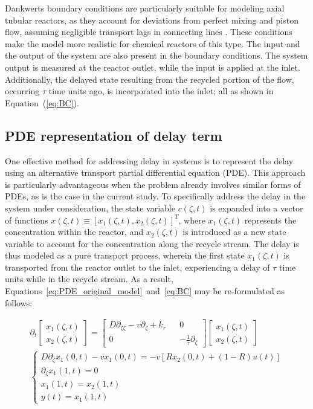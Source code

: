 Dankwerts boundary conditions are particularly suitable for modeling axial tubular reactors, as they account for deviations from perfect mixing and piston flow, assuming negligible transport lags in connecting lines \autocite{danckwerts1993continuous}. These conditions make the model more realistic for chemical reactors of this type. The input and the output of the system are also present in the boundary conditions. The system output is measured at the reactor outlet, while the input is applied at the inlet. Additionally, the delayed state resulting from the recycled portion of the flow, occurring $\tau$ time units ago, is incorporated into the inlet; all as shown in Equation~(\ref{eq:BC}).


\subsection{PDE representation of delay term}

One effective method for addressing delay in systems is to represent the delay using an alternative transport partial differential equation (PDE). This approach is particularly advantageous when the problem already involves similar forms of PDEs, as is the case in the current study. To specifically address the delay in the system under consideration, the state variable $c(\zeta, t)$ is expanded into a vector of functions $x(\zeta, t) \equiv [x_1(\zeta, t), x_2(\zeta, t)]^T$, where $x_1(\zeta, t)$ represents the concentration within the reactor, and $x_2(\zeta, t)$ is introduced as a new state variable to account for the concentration along the recycle stream. The delay is thus modeled as a pure transport process, wherein the first state $x_1(\zeta, t)$ is transported from the reactor outlet to the inlet, experiencing a delay of $\tau$ time units while in the recycle stream. As a result, Equations~\ref{eq:PDE_original_model}~and~\ref{eq:BC} may be re-formulated as follows:

\begin{align}
    \partial_t 
    \begin{bmatrix}
        x_1(\zeta, t) \\ x_2(\zeta,t)
    \end{bmatrix}
    =
    \begin{bmatrix}
        D \partial_{\zeta \zeta} - v \partial_\zeta + k_r && 0 \\
        0 && -\frac{1}{\tau} \partial_\zeta
    \end{bmatrix}
    \begin{bmatrix}
        x_1(\zeta, t) \\ x_2(\zeta,t)
    \end{bmatrix}\\
\begin{cases}
    D \partial_\zeta x_1(0, t) - v x_1(0, t) = -v \left[ R x_2(0, t) + (1-R) u(t) \right] \\
    \partial_\zeta x_1(1, t) = 0 \\
    x_1(1,t) = x_2(1,t) \\
    y(t) = x_1(1, t)
\end{cases}
\end{align}

